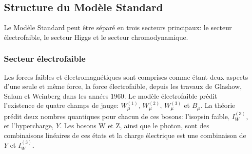 

\subsection{Structure du Modèle Standard}
\label{sec:ms:th:struct}

Le Modèle Standard peut être séparé en trois secteurs principaux: le
secteur électrofaible, le secteur Higgs et le secteur chromodynamique.

\subsubsection{Secteur électrofaible}
\label{sec:ms:th:struct:ewk}

Les forces faibles et électromagnétiques sont comprises comme étant
deux aspects d'une seule et même force, la force électrofaible, depuis
les travaux de Glashow, Salam et Weinberg dans les années 1960. Le
modèle électrofaible prédit l'existence de quatre champs de jauge:
$W^{(1)}_\mu$, $W^{(2)}_\mu$, $W^{(3)}_\mu$ et $B_\mu$. La théorie
prédit deux nombres quantiques pour chacun de ces bosons: l'isopsin
faible, $I^{(3)}_W$, et l'hypercharge, $Y$. Les bosons W et Z, ainsi
que le photon, sont des combinaisons linéaires de ces états et la
charge électrique est une combinaison  de $Y$ et $I^{(3)}_W$.


